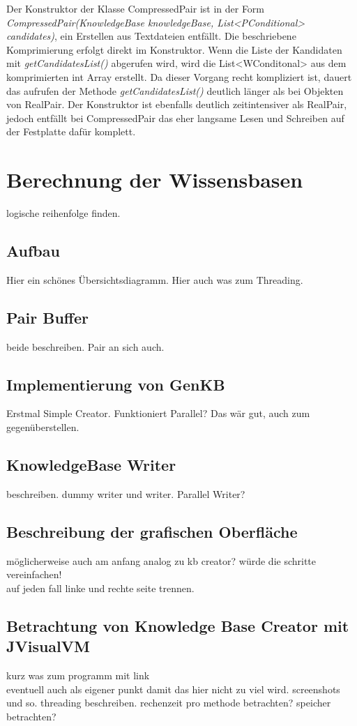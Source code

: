\documentclass[12pt,a4paper]{article}
\begin{document}
Der Konstruktor der Klasse CompressedPair ist in der Form \textit{CompressedPair(KnowledgeBase knowledgeBase, List<PConditional> candidates)},  ein Erstellen aus Textdateien entfällt. Die beschriebene Komprimierung erfolgt direkt im Konstruktor. Wenn die Liste der Kandidaten mit \textit{getCandidatesList()} abgerufen wird, wird die List<WConditonal> aus dem komprimierten int Array erstellt. Da dieser Vorgang recht kompliziert ist, dauert das aufrufen der Methode \textit{getCandidatesList()} deutlich länger als bei Objekten von RealPair. Der Konstruktor ist ebenfalls deutlich zeitintensiver als RealPair, jedoch entfällt bei CompressedPair das eher langsame Lesen und Schreiben auf der Festplatte dafür komplett.



\section{Berechnung der Wissensbasen}
logische reihenfolge finden.

\subsection{Aufbau}

Hier ein schönes Übersichtsdiagramm. Hier auch was zum Threading.
\subsection{Pair Buffer}
\label{sec:pairbuffer}
beide beschreiben.  Pair an sich auch.
\subsection{Implementierung von GenKB}
Erstmal Simple Creator. Funktioniert Parallel? Das wär gut, auch zum gegenüberstellen.
\subsection{KnowledgeBase Writer}
beschreiben. dummy writer und writer. Parallel Writer?

\subsection{Beschreibung der grafischen Oberfläche}
möglicherweise auch am anfang analog zu kb creator? würde die schritte vereinfachen! \\
auf jeden fall linke und rechte seite trennen.
\subsection{Betrachtung von Knowledge Base Creator mit JVisualVM}
kurz was zum programm mit link \\
eventuell auch als eigener punkt damit das hier nicht zu viel wird. screenshots und so. threading beschreiben. rechenzeit pro methode betrachten? speicher betrachten?



\newpage

 
\end{document}
